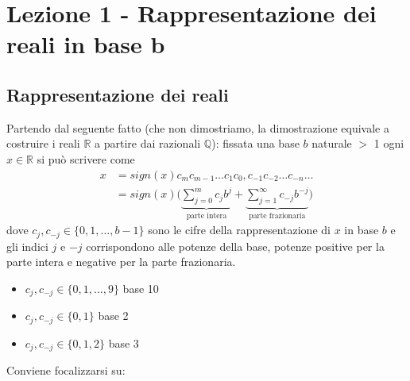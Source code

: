 \section{Lezione 1 - Rappresentazione dei reali in base b}
\subsection{Rappresentazione dei reali}
Partendo dal seguente fatto (che non dimostriamo, la dimostrazione equivale a costruire i reali $\mathbb{R}$ a partire dai razionali $\mathbb{Q}$): fissata una base $b$ naturale $>$ 1 ogni $x \in \mathbb{R}$ si può scrivere come
\[ \begin{split}
    x & = sign(x)c_mc_{m-1} \dotsc c_1c_0,c_{-1}c_{-2} \dotsc c_{-n} \dotsc \\
    & = sign(x) \biggl( \underbrace{\sum_{j=0}^m c_j b^j}_{\text {parte intera}} + %
    \underbrace{\sum_{j=1}^\infty c_{-j} b^{-j}}_{\text {parte frazionaria}} \biggr) 
\end{split} \]
dove $c_j,c_{-j} \in \{0,1,\dotsc,b-1\}$ sono le cifre della rappresentazione di $x$ in base $b$ e gli indici $j$ e $-j$ corrispondono alle potenze della base, potenze positive per la parte intera e negative per la parte frazionaria.

\begin{esempio} \end{esempio}
\begin{itemize}
    \item $c_j,c_{-j} \in \{0,1,\dotsc,9\}$ base 10
    \item $c_j,c_{-j} \in \{0,1\}$ base 2
    \item $c_j,c_{-j} \in \{0,1,2\}$ base 3
\end{itemize}
Conviene focalizzarsi su:


